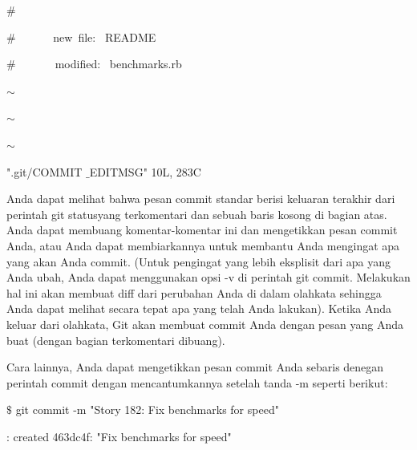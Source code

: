 \noindent 
{\fontsize{14pt}{14pt}\selectfont  $  \#  $ \\} \par
\noindent 
{\fontsize{14pt}{14pt}\selectfont  $  \#  $~~~~~~ new~file:~  README \\} \par
\noindent 
{\fontsize{14pt}{14pt}\selectfont  $  \#  $~~~~~~~modified:~  benchmarks.rb \\} \par
\noindent 
{\fontsize{14pt}{14pt}\selectfont  $  \sim  $ \\} \par
\noindent 
{\fontsize{14pt}{14pt}\selectfont  $  \sim  $ \\} \par
\noindent 
{\fontsize{14pt}{14pt}\selectfont  $  \sim  $ \\} \par
\noindent 
{\fontsize{14pt}{14pt}\selectfont ".git/COMMIT $  \_  $EDITMSG" 10L, 283C \\} \par
\vspace{14pt}
\noindent 
{\fontsize{14pt}{14pt}\selectfont Anda dapat melihat bahwa pesan commit standar berisi keluaran terakhir dari perintah $  $git statusyang terkomentari dan sebuah baris kosong di bagian atas. Anda dapat membuang komentar-komentar ini dan mengetikkan pesan commit Anda, atau Anda dapat membiarkannya untuk membantu Anda mengingat apa yang akan Anda commit. (Untuk pengingat yang lebih eksplisit dari apa yang Anda ubah, Anda dapat menggunakan opsi $  $-v $  $di perintah $  $git commit. Melakukan hal ini akan membuat diff dari perubahan Anda di dalam olahkata sehingga Anda dapat melihat secara tepat apa yang telah Anda lakukan). Ketika Anda keluar dari olahkata, Git akan membuat commit Anda dengan pesan yang Anda buat (dengan bagian terkomentari dibuang). \\} \par
\noindent 
{\fontsize{14pt}{14pt}\selectfont Cara lainnya, Anda dapat mengetikkan pesan commit Anda sebaris denegan perintah $  $commit $  $dengan mencantumkannya setelah tanda -m seperti berikut: \\} \par
\vspace{14pt}
\noindent 
{\fontsize{14pt}{14pt}\selectfont  $  \$  $ git commit -m "Story 182: Fix benchmarks for speed" \\} \par
\noindent 
{\fontsize{14pt}{14pt}\selectfont [master]: created 463dc4f: "Fix benchmarks for speed" \\} \par
